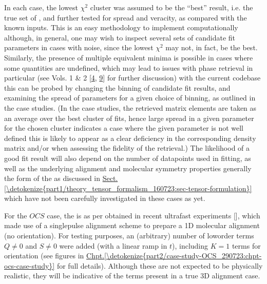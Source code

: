 \documentclass[letterpaper,table,10pt,english]{jupyterBook}
\begin{document}
\sphinxAtStartPar
In each case, the lowest \(\chi^2\) cluster was assumed to be the “best” result, i.e. the true set of {\hyperref[\detokenize{backmatter/glossary:term-radial-matrix-elements}]{}}, and further tested for spread and veracity, as compared with the known inputs. This is an easy methodology to implement computationally although, in general, one may wish to inspect several sets of candidate fit parameters in cases with noise, since the lowest \(\chi^2\) may not, in fact, be the best. Similarly, the presence of multiple equivalent minima is possible in cases where some quantities are undefined, which may lead to issues with phase retrieval in particular (see  Vols. 1 \& 2 {[}\hyperlink{cite.backmatter/bibliography:id675}{4}, \hyperlink{cite.backmatter/bibliography:id676}{9}{]} for further discussion) \sphinxhyphen{} with the current codebase this can be probed by changing the binning of candidate fit results, and examining the spread of parameters for a given choice of binning, as outlined in the case studies. (In the case studies, the retrieved matrix elements are taken as an average over the best cluster of fits, hence large spread in a given parameter for the chosen cluster indicates a case where the given parameter is not well defined \sphinxhyphen{} this is likely to appear as a clear deficiency in the corresponding density matrix and/or {\hyperref[\detokenize{backmatter/glossary:term-MF}]{}} when assessing the fidelity of the retrieval.) The likelihood of a good fit result will also depend on the number of data\sphinxhyphen{}points used in fitting, as well as the underlying alignment and molecular symmetry properties \sphinxhyphen{} generally the form of the {\hyperref[\detokenize{backmatter/glossary:term-channel-functions}]{}} as discussed in \hyperref[\detokenize{part1/theory_tensor_formalism_160723:sec-tensor-formulation}]{Sect.\@ \ref{\detokenize{part1/theory_tensor_formalism_160723:sec-tensor-formulation}}} \sphinxhyphen{} which have not been carefully investigated in these cases as yet.

\sphinxAtStartPar
For the \(OCS\) case, the {\hyperref[\detokenize{backmatter/glossary:term-RWP}]{}} is as per obtained in recent ultrafast experiments {[}{]}, which made use of a single\sphinxhyphen{}pulse alignment scheme to prepare a 1D molecular alignment (no orientation). For testing purposes, an (arbitrary) number of low\sphinxhyphen{}order terms \(Q\neq0\) and \(S\neq0\) were added (with a linear ramp in \(t\)), including \(K=1\) terms for orientation (see figures in \hyperref[\detokenize{part2/case-study-OCS_290723:chpt-ocs-case-study}]{Chpt.\@ \ref{\detokenize{part2/case-study-OCS_290723:chpt-ocs-case-study}}} for full details). Although these are not expected to be physically realistic, they will be indicative of the terms present in a true 3D alignment case.
\end{document}
